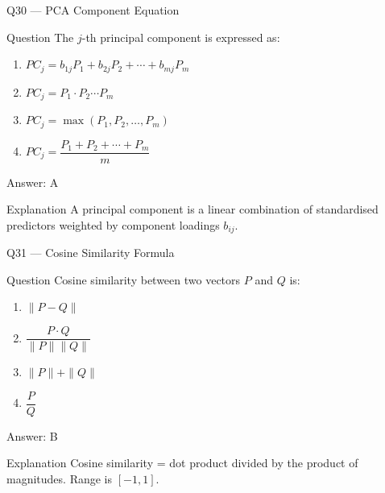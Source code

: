 \documentclass[aspectratio=169,8pt]{beamer}
\begin{document}
	\begin{frame}{Q30 --- PCA Component Equation}
		\begin{block}{Question}
			The $j$-th principal component is expressed as:
			\begin{enumerate}
				\item $PC_j = b_{1j} P_1 + b_{2j} P_2 + \cdots + b_{mj} P_m$
				\item $PC_j = P_1 \cdot P_2 \cdots P_m$
				\item $PC_j = \max(P_1, P_2, \ldots, P_m)$
				\item $PC_j = \dfrac{P_1 + P_2 + \cdots + P_m}{m}$
			\end{enumerate}
		\end{block}
		\begin{exampleblock}{Answer: A}\end{exampleblock}
		\begin{block}{Explanation}
			A principal component is a linear combination of standardised predictors weighted by component loadings $b_{ij}$.
		\end{block}
	\end{frame}
	
	\begin{frame}{Q31 --- Cosine Similarity Formula}
		\begin{block}{Question}
			Cosine similarity between two vectors $P$ and $Q$ is:
			\begin{enumerate}
				\item $\|P - Q\|$
				\item $\dfrac{P \cdot Q}{\|P\| \|Q\|}$
				\item $\|P\| + \|Q\|$
				\item $\dfrac{P}{Q}$
			\end{enumerate}
		\end{block}
		\begin{exampleblock}{Answer: B}\end{exampleblock}
		\begin{block}{Explanation}
			Cosine similarity = dot product divided by the product of magnitudes. Range is $[-1, 1]$.
		\end{block}
	\end{frame}
	
\end{document}
